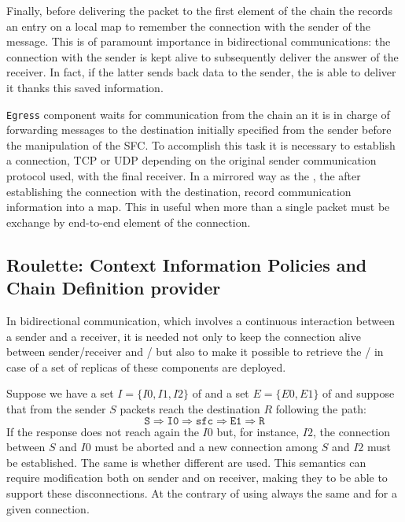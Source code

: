 Finally, before delivering the packet to the first element of the chain the
\ingress{} records an entry on a local map to remember the connection with
the sender of the message. This is of paramount importance in bidirectional
communications: the connection with the sender is kept alive to
subsequently deliver the answer of the receiver. In fact, if the latter sends
back data to the sender, the \ingress{} is able to deliver it thanks this
saved information.

\texttt{Egress} component waits for communication from the chain an it is in
charge of forwarding messages to the destination initially specified from the
sender before the manipulation of the SFC. To accomplish this task it is
necessary to establish a connection, TCP or UDP depending on the original
sender communication protocol used, with the final receiver. In a mirrored way
as the \ingress{}, the \egress{} after establishing the connection with the
destination, record communication information into a map. This in useful when
more than a single packet must be exchange by end-to-end element of the
connection.

\subsection{Roulette: Context Information Policies and Chain Definition
provider}
In bidirectional communication, which involves a continuous interaction between a
sender and a receiver, it is needed not only to keep the connection alive
between sender/receiver and \ingress{}/\egress{} but also to make it possible to
retrieve the \ingress{}/\egress{} in case of a set of replicas of these
components are deployed.
\begin{exmp}
  Suppose we have a set $I=\{I0, I1, I2\}$ of \ingresses{} and a set $E=\{E0,
  E1\}$ of \egresses{} and suppose that from the sender $S$ packets reach the
  destination $R$ following the path:
  \begin{equation*}
    \texttt{S} \Longrightarrow \texttt{I0} \Longrightarrow \texttt{sfc}
    \Longrightarrow \texttt{E1} \Longrightarrow \texttt{R}
  \end{equation*}
  If the response does not reach again the \ingress{} $I0$ but, for instance,
  $I2$, the connection between $S$ and $I0$ must be aborted and a new connection
  among $S$ and $I2$ must be established. The same is whether different
  \egresses{} are used. This semantics can require modification both on sender
  and on receiver, making they to be able to support these disconnections. At
  the contrary of using always the same \ingress{} and \egress{} for a given
  connection.
\end{exmp}


